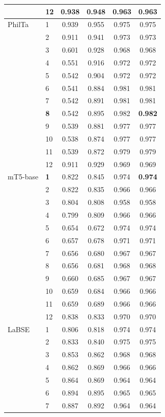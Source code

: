 \begin{longtable}{llcccc}
 & 12 & 0.938 & 0.948 & 0.963 & 0.963 \\
\midrule
PhilTa & 1 & 0.939 & 0.955 & 0.975 & 0.975 \\
 & 2 & 0.911 & 0.941 & 0.973 & 0.973 \\
 & 3 & 0.601 & 0.928 & 0.968 & 0.968 \\
 & 4 & 0.551 & 0.916 & 0.972 & 0.972 \\
 & 5 & 0.542 & 0.904 & 0.972 & 0.972 \\
 & 6 & 0.541 & 0.884 & 0.981 & 0.981 \\
 & 7 & 0.542 & 0.891 & 0.981 & 0.981 \\
 & \textbf{8} & 0.542 & 0.895 & 0.982 & \textbf{0.982} \\
 & 9 & 0.539 & 0.881 & 0.977 & 0.977 \\
 & 10 & 0.538 & 0.874 & 0.977 & 0.977 \\
 & 11 & 0.539 & 0.872 & 0.979 & 0.979 \\
 & 12 & 0.911 & 0.929 & 0.969 & 0.969 \\
\midrule
mT5-base & \textbf{1} & 0.822 & 0.845 & 0.974 & \textbf{0.974} \\
 & 2 & 0.822 & 0.835 & 0.966 & 0.966 \\
 & 3 & 0.804 & 0.808 & 0.958 & 0.958 \\
 & 4 & 0.799 & 0.809 & 0.966 & 0.966 \\
 & 5 & 0.654 & 0.672 & 0.974 & 0.974 \\
 & 6 & 0.657 & 0.678 & 0.971 & 0.971 \\
 & 7 & 0.656 & 0.680 & 0.967 & 0.967 \\
 & 8 & 0.656 & 0.681 & 0.968 & 0.968 \\
 & 9 & 0.660 & 0.685 & 0.967 & 0.967 \\
 & 10 & 0.659 & 0.684 & 0.966 & 0.966 \\
 & 11 & 0.659 & 0.689 & 0.966 & 0.966 \\
 & 12 & 0.838 & 0.833 & 0.970 & 0.970 \\
\midrule
LaBSE & 1 & 0.806 & 0.818 & 0.974 & 0.974 \\
 & 2 & 0.833 & 0.840 & 0.975 & 0.975 \\
 & 3 & 0.853 & 0.862 & 0.968 & 0.968 \\
 & 4 & 0.862 & 0.869 & 0.966 & 0.966 \\
 & 5 & 0.864 & 0.869 & 0.964 & 0.964 \\
 & 6 & 0.894 & 0.895 & 0.965 & 0.965 \\
 & 7 & 0.887 & 0.892 & 0.964 & 0.964 \\

\end{longtable}
